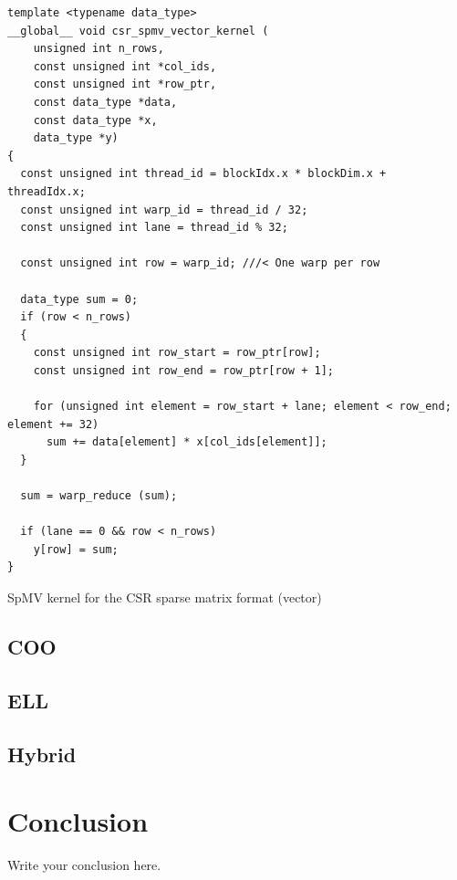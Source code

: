 \documentclass{article}
\begin{document}
\begin{listing}[H]
\begin{verbatim}
template <typename data_type>
__global__ void csr_spmv_vector_kernel (
    unsigned int n_rows,
    const unsigned int *col_ids,
    const unsigned int *row_ptr,
    const data_type *data,
    const data_type *x,
    data_type *y)
{
  const unsigned int thread_id = blockIdx.x * blockDim.x + threadIdx.x;
  const unsigned int warp_id = thread_id / 32;
  const unsigned int lane = thread_id % 32;

  const unsigned int row = warp_id; ///< One warp per row

  data_type sum = 0;
  if (row < n_rows)
  {
    const unsigned int row_start = row_ptr[row];
    const unsigned int row_end = row_ptr[row + 1];

    for (unsigned int element = row_start + lane; element < row_end; element += 32)
      sum += data[element] * x[col_ids[element]];
  }

  sum = warp_reduce (sum);

  if (lane == 0 && row < n_rows)
    y[row] = sum;
}
\end{verbatim}
\caption{SpMV kernel for the CSR sparse matrix format (vector)}
\label{csr_vector}
\end{listing}

\subsection{COO}

\subsection{ELL}

\subsection{Hybrid}


\section{Conclusion}
Write your conclusion here.
\end{document}
